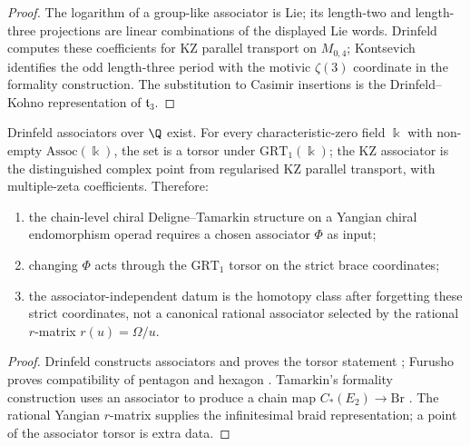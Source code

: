 \begin{proof}
The logarithm of a group-like associator is Lie; its length-two and
length-three projections are linear combinations of the
displayed Lie words. Drinfeld computes these coefficients for KZ
parallel transport on $M_{0,4}$; Kontsevich identifies the odd
length-three period with the motivic $\zeta(3)$ coordinate in the
formality construction. The substitution to Casimir insertions is the
Drinfeld--Kohno representation of $\mathfrak t_3$.
\end{proof}

\begin{proposition}%
\label{prop:yangian-associator-order-3-explicit}%
%
%
%
Drinfeld associators over $\Q$ exist. For every characteristic-zero
field $\Bbbk$ with non-empty $\mathrm{Assoc}(\Bbbk)$, the set is a torsor under
$\mathrm{GRT}_1(\Bbbk)$; the KZ associator is the distinguished
complex point from regularised KZ parallel transport, with
multiple-zeta coefficients. Therefore:
\begin{enumerate}
 \item[\textup{(i)}] the chain-level chiral Deligne--Tamarkin
 structure on a Yangian chiral endomorphism operad requires a chosen
 associator $\Phi$ as input;
 \item[\textup{(ii)}] changing $\Phi$ acts through the
 $\mathrm{GRT}_1$ torsor on the strict brace coordinates;
 \item[\textup{(iii)}] the associator-independent datum is the
 homotopy class after forgetting these strict coordinates, not a
 canonical rational associator selected by the rational $r$-matrix
 $r(u)=\Omega/u$.
\end{enumerate}
\end{proposition}

\begin{proof}
Drinfeld constructs associators and proves the torsor statement
\cite{Drinfeld90QuasiHopf}; Furusho proves compatibility of
pentagon and hexagon
\cite{Furusho2010PentagonImpliesHexagon}. Tamarkin's formality
construction uses an associator to produce a chain map
$C_\ast(E_2)\to\mathrm{Br}$ \cite{Tamarkin2003}. The rational
Yangian $r$-matrix supplies the infinitesimal braid representation;
a point of the associator torsor is extra data.
\end{proof}

